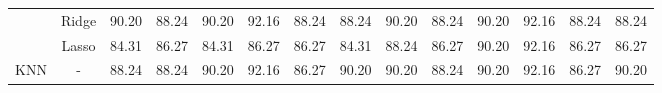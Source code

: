 \begin{landscape}
\begin{table}[]
{\begin{tabular}{cc|cccccccccccc}
                                & Ridge                                 & 90.20                                                             & 88.24                                                                & 90.20                                                                & 92.16                                                               & 88.24                                                            & \multicolumn{1}{c|}{88.24}                                                                   & 90.20                                                             & 88.24                                                                & 90.20                                                                & 92.16                                                               & 88.24                                                            & 88.24                                                                   \\
                                & Lasso                                 & 84.31                                                             & 86.27                                                                & 84.31                                                                & 86.27                                                               & 86.27                                                            & \multicolumn{1}{c|}{84.31}                                                                   & 88.24                                                             & 86.27                                                                & 90.20                                                                & 92.16                                                               & 86.27                                                            & 86.27                                                                   \\ \hline
KNN                             & -                                     & 88.24                                                             & 88.24                                                                & 90.20                                                                & 92.16                                                               & 86.27                                                            & \multicolumn{1}{c|}{90.20}                                                                   & 90.20                                                             & 88.24                                                                & 90.20                                                                & 92.16                                                               & 86.27                                                            & 90.20                                                                   \\ \hline

\end{tabular}}
\end{table}
\end{landscape}
